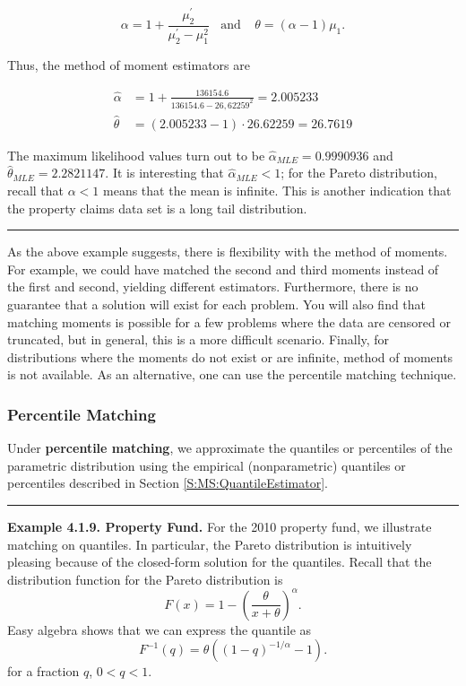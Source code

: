 \documentclass[]{book}
\theoremstyle{definition}
\theoremstyle{definition}
\theoremstyle{definition}
\theoremstyle{remark}
\begin{document}
\[\alpha = 1+ \frac{\mu_2^{\prime}}{\mu_2^{\prime}-\mu_1^2} \ \ \ \
\text{and} \ \ \ \ \
 \theta = (\alpha-1)\mu_1.\]

Thus, the method of moment estimators are

\[\begin{aligned}
\hat{\alpha} &=  1+ \frac{136154.6}{136154.6-26,62259^2} = 2.005233 \\
\hat{\theta} &=  (2.005233-1) \cdot 26.62259 = 26.7619
\end{aligned}\]

The maximum likelihood values turn out to be
\(\hat{\alpha}_{MLE} = 0.9990936\) and
\(\hat{\theta}_{MLE} = 2.2821147\). It is interesting that
\(\hat{\alpha}_{MLE}<1\); for the Pareto distribution, recall that
\(\alpha <1\) means that the mean is infinite. This is another
indication that the property claims data set is a long tail
distribution.

\begin{center}\rule{0.5\linewidth}{\linethickness}\end{center}

As the above example suggests, there is flexibility with the method of
moments. For example, we could have matched the second and third moments
instead of the first and second, yielding different estimators.
Furthermore, there is no guarantee that a solution will exist for each
problem. You will also find that matching moments is possible for a few
problems where the data are censored or truncated, but in general, this
is a more difficult scenario. Finally, for distributions where the
moments do not exist or are infinite, method of moments is not
available. As an alternative, one can use the percentile matching
technique.

\subsubsection{Percentile Matching}\label{percentile-matching}

Under \textbf{percentile matching}, we approximate the quantiles or
percentiles of the parametric distribution using the empirical
(nonparametric) quantiles or percentiles described in Section
\ref{S:MS:QuantileEstimator}.

\begin{center}\rule{0.5\linewidth}{\linethickness}\end{center}

\textbf{Example 4.1.9. Property Fund.} For the 2010 property fund, we
illustrate matching on quantiles. In particular, the Pareto distribution
is intuitively pleasing because of the closed-form solution for the
quantiles. Recall that the distribution function for the Pareto
distribution is
\[F(x) = 1 - \left(\frac{\theta}{x+\theta}\right)^{\alpha}.\] Easy
algebra shows that we can express the quantile as
\[F^{-1}(q) = \theta \left( (1-q)^{-1/\alpha} -1 \right).\] for a
fraction \(q\), \(0<q<1\).
\end{document}
